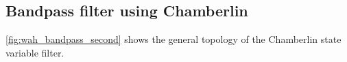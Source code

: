 %	
%	
%	
%	
%	
%	
%	
%	
%
%
%
%
%
%
%
%		

\subsection{Bandpass filter using Chamberlin}

\autoref{fig:wah_bandpass_second} shows the general topology of the Chamberlin state variable filter.

